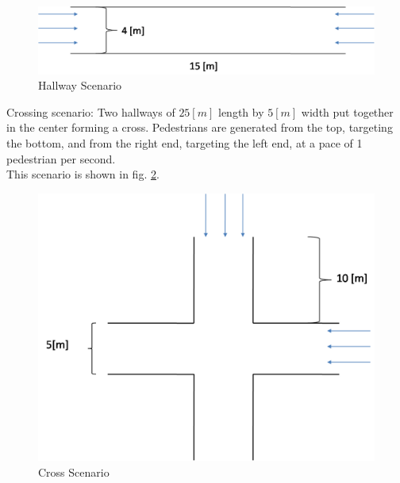 \documentclass[english]{article}
\begin{document}
        \begin{figure}[H]
            \centering{}
            \includegraphics[scale=0.35]{pics/scenarios/hallway}
            \caption{\label{fig:hallway-scenario}Hallway Scenario}
        \end{figure}
        
        Crossing scenario: Two hallways of $25[m]$ length by $5[m]$ width
        put together in the center forming a cross. Pedestrians are generated
        from the top, targeting the bottom, and from the right end, targeting
        the left end, at a pace of 1 pedestrian per second. \\
         This scenario is shown in fig. \ref{fig:cross-scenario}.
        
        \begin{figure}[H]
            \centering{}
            \includegraphics[scale=0.3]{pics/scenarios/cross}
            \caption{\label{fig:cross-scenario} Cross Scenario}
        \end{figure}
    
\end{document}
